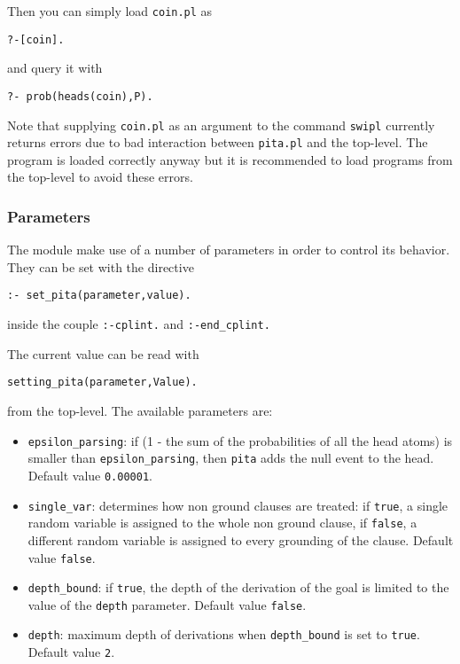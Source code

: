 \documentclass[a4paper,10pt]{article}
\begin{document}
Then you can simply load \texttt{coin.pl} as
\begin{verbatim}
?-[coin].
\end{verbatim}
and query it with
\begin{verbatim}
?- prob(heads(coin),P).
\end{verbatim}
Note that supplying \texttt{coin.pl} as an argument to the command \texttt{swipl} currently returns errors due to bad interaction between \texttt{pita.pl} and the top-level.
The program is loaded correctly anyway but it is recommended to load programs from the top-level to avoid these errors.



\subsubsection{Parameters}
The module make use of a number of parameters in order to control its behavior. They can be set with the directive
\begin{verbatim}
:- set_pita(parameter,value).
\end{verbatim}
inside the couple \texttt{:-cplint.} and \texttt{:-end\_cplint.} 

The current value can be read with
\begin{verbatim}
setting_pita(parameter,Value).
\end{verbatim}
from the top-level.
The available parameters are:
\begin{itemize}
\item 
	 \verb|epsilon_parsing|: if (1 - the sum of the probabilities of all the head atoms) is smaller than 
    \verb|epsilon_parsing|,
		then \texttt{pita} adds the null event to the head. Default value \texttt{0.00001}.
\item \verb|single_var|: determines how non ground clauses are treated: if \texttt{true}, a single random variable is assigned to the whole non ground clause, 
if \texttt{false}, a different random variable is assigned to every grounding of the clause. Default value \texttt{false}.
\item \verb|depth_bound|: if \texttt{true}, the depth of the derivation of the goal is limited to the value of the \texttt{depth} parameter.  Default value \texttt{false}.
\item  \texttt{depth}: maximum depth of derivations when  \verb|depth_bound| is set to \texttt{true}. Default value \texttt{2}.
\end{itemize}
\end{document}
